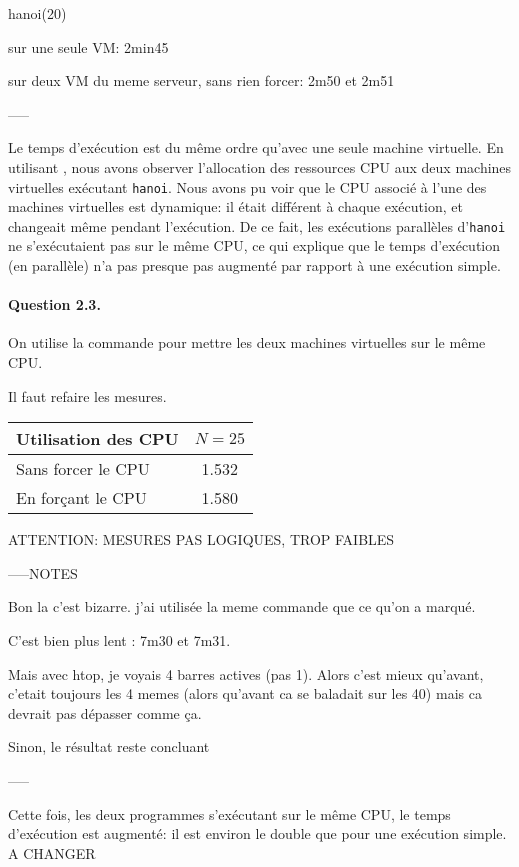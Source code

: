 \documentclass[12pt]{article}
\begin{document}
hanoi(20)

sur une seule VM: 2min45

sur deux VM du meme serveur, sans rien forcer: 2m50 et 2m51





-----




Le temps d'exécution est du même ordre qu'avec une seule machine virtuelle. En utilisant , nous avons observer l'allocation des ressources CPU aux deux machines virtuelles exécutant \texttt{hanoi}. Nous avons pu voir que le CPU associé à l'une des machines virtuelles est dynamique: il était différent à chaque exécution, et changeait même pendant l'exécution. De ce fait, les exécutions parallèles d'\texttt{hanoi} ne s'exécutaient pas sur le même CPU, ce qui explique que le temps d'exécution (en parallèle) n'a pas presque pas augmenté par rapport à une exécution simple.


\paragraph{Question 2.3.}
On utilise la commande  pour mettre les deux machines virtuelles sur le même CPU.


Il faut refaire les mesures.

\begin{tabular}{| l | c |}\hline
Utilisation des CPU & $N=25$ \\\hline
Sans forcer le CPU & 1.532 \\\hline
En forçant le CPU & 1.580 \\\hline
\end{tabular}

ATTENTION: MESURES PAS LOGIQUES, TROP FAIBLES

-----NOTES

Bon la c'est bizarre. j'ai utilisée la meme commande que ce qu'on a marqué.

C'est bien plus lent : 7m30 et 7m31.

Mais avec htop, je voyais 4 barres actives (pas 1). Alors c'est mieux qu'avant, c'etait toujours les 4 memes (alors qu'avant ca se baladait sur les 40) mais ca devrait pas dépasser comme ça.

Sinon, le résultat reste concluant


-----


Cette fois, les deux programmes s'exécutant sur le même CPU, le temps d'exécution est augmenté: il est environ le double que pour une exécution simple. A CHANGER
\end{document}
